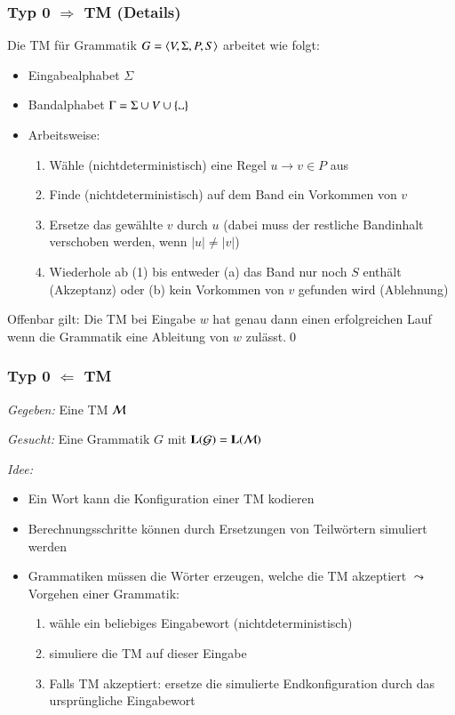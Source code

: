\documentclass[onlymath]{beamer}
\begin{document}
\begin{frame}\frametitle{Typ 0 $\Rightarrow$ TM (Details)}

Die TM für Grammatik $G=\langle{V,\Sigma,P,S}\rangle$ arbeitet wie folgt:
\begin{itemize}
\item Eingabealphabet $\Sigma$
\item Bandalphabet $\Gamma=\Sigma\cup V\cup\{\blank\}$
\item Arbeitsweise:
	\begin{enumerate}[(1)]
	\item Wähle (nichtdeterministisch) eine Regel $u\to v\in P$ aus
	\item Finde (nichtdeterministisch) auf dem Band ein Vorkommen von $v$
	\item Ersetze das gewählte $v$ durch $u$ (dabei muss der restliche Bandinhalt verschoben werden, wenn $|u|\neq|v|$)
	\item Wiederhole ab (1) bis entweder (a) das Band nur noch $S$ enthält (Akzeptanz) oder (b) kein Vorkommen von $v$ gefunden wird (Ablehnung)
	\end{enumerate}
\end{itemize}

Offenbar gilt: Die TM bei Eingabe $w$ hat genau dann einen erfolgreichen Lauf wenn die Grammatik eine Ableitung von $w$ zulässt.\qed


\end{frame}

\begin{frame}\frametitle{Typ 0 $\Leftarrow$ TM}

\emph{Gegeben:} Eine TM $\mathcal{M}$
\medskip

\emph{Gesucht:} Eine Grammatik $G$ mit $\textbf{\textcolor{black}{L}}(\mathcal{G})=\textbf{\textcolor{black}{L}}(\mathcal{M})$
\medskip\pause

\emph{Idee:}
\begin{itemize}
\item Ein Wort kann die Konfiguration einer TM kodieren
\item Berechnungsschritte können durch Ersetzungen von Teilwörtern simuliert werden\pause
\item Grammatiken müssen die Wörter erzeugen, welche die TM akzeptiert $\leadsto$ Vorgehen einer Grammatik:
\begin{enumerate}[(1)]
\item wähle ein beliebiges Eingabewort (nichtdeterministisch)
\item simuliere die TM auf dieser Eingabe
\item Falls TM akzeptiert: ersetze die simulierte Endkonfiguration durch das ursprüngliche Eingabewort
\end{enumerate}
\end{itemize}

\end{frame}
\end{document}
